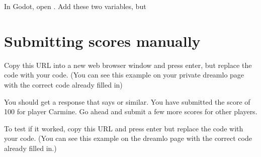 \documentclass[a4paper,12pt,english]{sphinxmanual}
\begin{document}
\sphinxAtStartPar
In Godot, open . Add these two variables, but 

\begin{sphinxVerbatim}[commandchars=\\\{\}]
   
   
\end{sphinxVerbatim}


\section{Submitting scores manually}
\label{\detokenize{tutorial:submitting-scores-manually}}
\sphinxAtStartPar
Copy this URL into a new web browser window and press enter, but replace
the code with your  code. (You can see this example on your
private dreamlo page with the correct code already filled in)

\begin{sphinxVerbatim}[commandchars=\\\{\}]
\end{sphinxVerbatim}

\sphinxAtStartPar
{}

\sphinxAtStartPar
You should get a response that says  or similar. You have submitted
the score of 100 for player Carmine. Go ahead and submit a few more
scores for other players.

\sphinxAtStartPar
To test if it worked, copy this URL and press enter but replace the code
with your  code. (You can see this example on the dreamlo page
with the correct code already filled in.)

\begin{sphinxVerbatim}[commandchars=\\\{\}]
\end{sphinxVerbatim}
\end{document}

